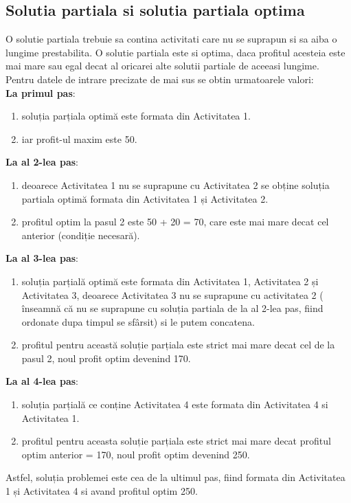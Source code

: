 \subsection{Solutia partiala si solutia partiala optima}
O solutie partiala trebuie sa contina activitati care nu se suprapun si sa aiba o lungime prestabilita. O solutie partiala este si optima, daca profitul acesteia este mai mare sau egal decat al oricarei alte solutii partiale de aceeasi lungime.  \\

Pentru datele de intrare precizate de mai sus se obtin urmatoarele valori:\\
\textbf{La primul pas}:
\begin{enumerate}
    \item soluția parțiala optimă este formata din Activitatea 1.
    \item iar profit-ul maxim este 50. \\
\end{enumerate}
\textbf{La al 2-lea pas}:
\begin{enumerate}
    \item deoarece Activitatea 1 nu se suprapune cu Activitatea 2 se obține soluția partiala optimă formata din Activitatea 1 și Activitatea 2.
    \item profitul optim la pasul 2 este 50 + 20 = 70, care este mai mare decat cel anterior (condiție necesară).
\end{enumerate}
\textbf{La al 3-lea pas}:
\begin{enumerate}
    \item soluția parțială optimă este formata din Activitatea 1, Activitatea 2 și Activitatea 3, deoarece Activitatea 3 nu se suprapune cu activitatea 2 ( înseamnă că nu se suprapune cu soluția partiala de la al 2-lea pas, fiind ordonate dupa timpul se sfârsit) si le putem concatena.
    \item profitul pentru această soluție parțiala este strict mai mare decat cel de la pasul 2, noul profit optim devenind 170. \\
\end{enumerate}
\textbf{La al 4-lea pas}:
\begin{enumerate}
    \item soluția parțială ce conține Activitatea 4 este formata din Activitatea 4 si Activitatea 1.
    \item profitul pentru aceasta soluție parțiala este strict mai mare decat profitul optim anterior = 170, noul profit optim devenind 250.
\end{enumerate} 
Astfel, soluția problemei este cea de la ultimul pas, fiind formata din Activitatea 1 și Activitatea 4 si avand profitul optim 250. 

